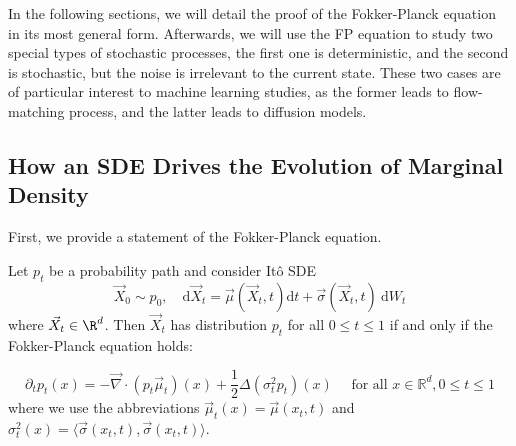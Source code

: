 \documentclass{article}
\begin{document}
In the following sections, we will detail the proof of the Fokker-Planck equation in its most general form. Afterwards, we will use the FP equation to study two special types of stochastic processes, the first one is deterministic, and the second is stochastic, but the noise is irrelevant to the current state. These two cases are of particular interest to machine learning studies, as the former leads to flow-matching process, and the latter leads to diffusion models. 

\subsection{How an SDE Drives the Evolution of Marginal Density}
First, we provide a statement of the Fokker-Planck equation. 
\begin{theorem}
Let $p_t$ be a probability path and consider Itô SDE
$$
\vec{X}_0 \sim p_0, \quad \mathrm{d} \vec{X}_t=\vec{\mu} \left(\vec{X}_t, t\right) \mathrm{d} t+\vec{\sigma}\left(\vec{X}_t,t\right) \mathrm{~d} W_t
$$
where $\vec{X}_t\in \R^{d}$. Then $\vec{X}_t$ has distribution $p_t$ for all $0 \leq t \leq 1$ if and only if the Fokker-Planck equation holds:

$$
\partial_t p_t(x)=-\vec{\nabla} \cdot \left(p_t {\vec{\mu}_t}\right)(x)+\frac{1}{2} \Delta (\sigma_t^2 p_t)(x) \quad \text { for all } x \in \mathbb{R}^d, 0 \leq t \leq 1
$$
where we use the abbreviations ${\vec{\mu}_t}(x)=\vec{\mu}(x_t,t)$ and $\sigma^2_t(x)=\langle \vec{\sigma}(x_t,t), \vec{\sigma}(x_t,t)\rangle$. 
\end{theorem}
\end{document}
